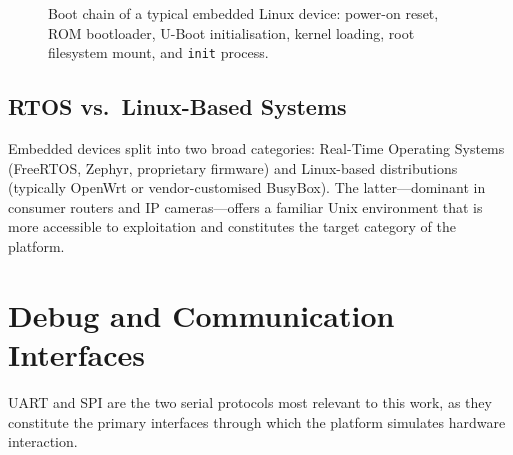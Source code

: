 \begin{figure}[ht]
    \centering
    \caption{Boot chain of a typical embedded Linux device: power-on reset, ROM bootloader, U-Boot initialisation, kernel loading, root filesystem mount, and \texttt{init} process.}
    \label{fig:boot-chain}
\end{figure}

\subsection{RTOS vs.\ Linux-Based Systems}\label{subsec:rtos-linux}

Embedded devices split into two broad categories: Real-Time Operating Systems (FreeRTOS, Zephyr, proprietary firmware) and Linux-based distributions (typically OpenWrt or vendor-customised BusyBox). The latter---dominant in consumer routers and IP cameras---offers a familiar Unix environment that is more accessible to exploitation and constitutes the target category of the \pcbctf{} platform.

\section{Debug and Communication Interfaces}\label{sec:interfaces}

UART and SPI are the two serial protocols most relevant to this work, as they constitute the primary interfaces through which the \pcbctf{} platform simulates hardware interaction.

